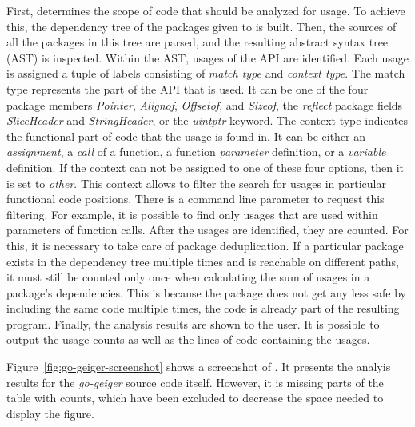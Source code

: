 First, \toolGeiger{} determines the scope of code that should be analyzed for \unsafe{} usage.
To achieve this, the dependency tree of the packages given to \toolGeiger{} is built.
Then, the sources of all the packages in this tree are parsed, and the resulting abstract syntax tree (\acrshort{AST})
is inspected.
Within the \acrshort{AST}, usages of the \unsafe{} \acrshort{API} are identified.
Each usage is assigned a tuple of labels consisting of \textit{match type} and \textit{context type}.
The match type represents the part of the \unsafe{} \acrshort{API} that is used.
It can be one of the four \unsafe{} package members \textit{Pointer}, \textit{Alignof}, \textit{Offsetof}, and
\textit{Sizeof}, the \textit{reflect} package fields \textit{SliceHeader} and \textit{StringHeader}, or the
\textit{uintptr} keyword.
The context type indicates the functional part of code that the usage is found in.
It can be either an \textit{assignment}, a \textit{call} of a function, a function \textit{parameter} definition, or a
\textit{variable} definition.
If the context can not be assigned to one of these four options, then it is set to \textit{other}.
This context allows to filter the search for \unsafe{} usages in particular functional code positions.
There is a \toolGeiger{} command line parameter to request this filtering.
For example, it is possible to find only \unsafe{} usages that are used within parameters of function calls.
After the \unsafe{} usages are identified, they are counted.
For this, it is necessary to take care of package deduplication.
If a particular package exists in the dependency tree multiple times and is reachable on different paths, it must still
be counted only once when calculating the sum of \unsafe{} usages in a package's dependencies.
This is because the package does not get any less safe by including the same code multiple times, the code is already
part of the resulting program.
Finally, the analysis results are shown to the user.
It is possible to output the \unsafe{} usage counts as well as the lines of code containing the usages.

Figure~\ref{fig:go-geiger-screenshot} shows a screenshot of \toolGeiger{}.
It presents the analyis results for the \textit{go-geiger} source code itself.
However, it is missing parts of the table with \unsafe{} counts, which have been excluded to decrease the space needed
to display the figure.

